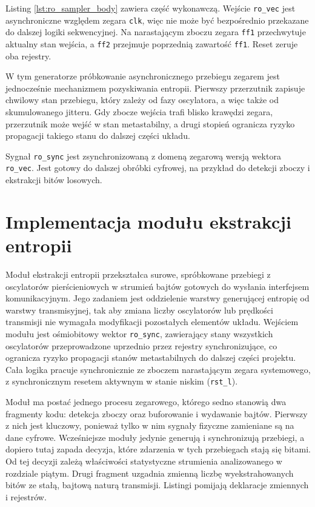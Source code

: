 Listing \ref{lst:ro_sampler_body} zawiera część wykonawczą. Wejście
\texttt{ro\_vec} jest asynchroniczne względem zegara \texttt{clk}, więc nie
może być bezpośrednio przekazane do dalszej logiki sekwencyjnej. Na narastającym
zboczu zegara \texttt{ff1} przechwytuje aktualny stan wejścia, a \texttt{ff2}
przejmuje poprzednią zawartość \texttt{ff1}. Reset zeruje oba rejestry.

W tym generatorze próbkowanie asynchronicznego przebiegu zegarem jest
jednocześnie mechanizmem pozyskiwania entropii. Pierwszy przerzutnik zapisuje
chwilowy stan przebiegu, który zależy od fazy oscylatora, a więc także od
skumulowanego jitteru. Gdy zbocze wejścia trafi blisko krawędzi zegara,
przerzutnik może wejść w stan metastabilny, a drugi stopień ogranicza
ryzyko propagacji takiego stanu do dalszej części układu.

Sygnał \texttt{ro\_sync} jest zsynchronizowaną z domeną zegarową wersją
wektora \texttt{ro\_vec}. Jest gotowy do dalszej obróbki cyfrowej, na
przykład do detekcji zboczy i ekstrakcji bitów losowych.

\section{Implementacja modułu ekstrakcji entropii}

Moduł ekstrakcji entropii przekształca surowe, spróbkowane przebiegi
z oscylatorów pierścieniowych w strumień bajtów gotowych do wysłania
interfejsem komunikacyjnym. Jego zadaniem jest oddzielenie warstwy generującej
entropię od warstwy transmisyjnej, tak aby zmiana liczby oscylatorów lub
prędkości transmisji nie wymagała modyfikacji pozostałych elementów układu.
Wejściem modułu jest ośmiobitowy wektor \texttt{ro\_sync}, zawierający stany
wszystkich oscylatorów przeprowadzone uprzednio przez rejestry synchronizujące,
co ogranicza ryzyko propagacji stanów metastabilnych do dalszej części projektu.
Cała logika pracuje synchronicznie ze zboczem narastającym zegara systemowego,
z synchronicznym resetem aktywnym w stanie niskim (\texttt{rst\_l}).

Moduł ma postać jednego procesu zegarowego, którego sedno stanowią dwa
fragmenty kodu: detekcja zboczy oraz buforowanie i wydawanie bajtów. Pierwszy
z nich jest kluczowy, ponieważ tylko w nim sygnały fizyczne zamieniane są na
dane cyfrowe. Wcześniejsze moduły jedynie generują i synchronizują przebiegi,
a dopiero tutaj zapada decyzja, które zdarzenia w tych przebiegach stają się
bitami. Od tej decyzji zależą właściwości statystyczne strumienia analizowanego
w rozdziale piątym. Drugi fragment uzgadnia zmienną liczbę wyekstrahowanych
bitów ze stałą, bajtową naturą transmisji. Listingi pomijają deklaracje
zmiennych i rejestrów.

